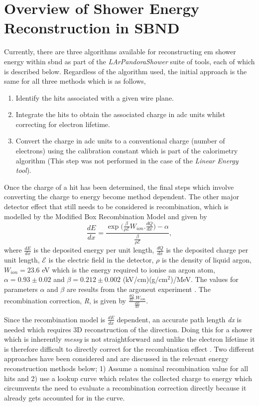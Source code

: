 \section{Overview of Shower Energy Reconstruction in SBND}\label{subchap:shower reco overview}

Currently, there are three algorithms available for reconstructing \gls{em} shower energy within \gls{sbnd} as part of the \textit{LArPandoraShower} suite of tools, each of which is described below. Regardless of the algorithm used, the initial approach is the same for all three methods which is as follows,
\begin{enumerate}
    \item Identify the hits associated with a given wire plane.
    \item Integrate the hits to obtain the associated charge in \gls{adc} units whilst correcting for electron lifetime. 
    \item Convert the charge in \gls{adc} units to a conventional charge (number of electrons) using the calibration constant which is part of the calorimetry algorithm (This step was not performed in the case of the \textit{Linear Energy tool}). 
\end{enumerate}

Once the charge of a hit has been determined, the final steps which involve converting the charge to energy become method dependent. The other major detector effect that still needs to be considered is recombination, which is modelled by the Modified Box Recombination Model and given by  
\begin{equation}\label{eqn:ModBox}
    \frac{dE}{dx} = \frac{\exp{(\frac{\beta}{\rho \mathcal{E}} W_{ion}.\frac{dQ}{dx}}) - \alpha}{\frac{\beta}{\rho \mathcal{E}}},
\end{equation}
where $\frac{dE}{dx}$ is the deposited energy per unit length, $\frac{dQ}{dx}$ is the deposited charge per unit length,  $\mathcal{E}$ is the electric field in the detector, $\rho$ is the density of liquid argon, $W_{ion} = 23.6$ eV which is the energy required to ionise an argon atom, $\alpha = 0.93 \pm 0.02$ and $\beta = 0.212 \pm 0.002$ (kV/cm)(g/cm$^2$)/MeV. The values for parameters $\alpha$ and $\beta$ are results from the \Gls{argoneut} experiment \cite{ArgoNeuT_recombination_paper}. The recombination correction, \textit{R}, is given by $\frac{\frac{dQ}{dx}.W_{ion}}{\frac{dE}{dx}}$.


Since the recombination model is $\frac{dE}{dx}$ dependent, an accurate path length \textit{dx} is needed which requires 3D reconstruction of the direction. Doing this for a shower which is inherently \textit{messy} is not straightforward and unlike the electron lifetime it is therefore difficult to directly correct for the recombination effect \cite{MicroBooNE_photon_Ereco_paper}. Two different approaches have been considered and are discussed in the relevant energy reconstruction methods below; 1) Assume a nominal recombination value for all hits and 2) use a lookup curve which relates the collected charge to energy which circumvents the need to evaluate a recombination correction directly because it already gets accounted for in the curve.


